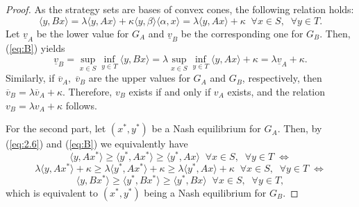 \documentclass[10pt,a4paper]{amsart}
\begin{document}
\begin{proof}
As the strategy sets are bases of convex cones, the following relation holds:
\begin{equation}\label{eq:B}
    \langle y,Bx\rangle=\lambda\langle y,Ax\rangle +\kappa\langle y,\beta\rangle\langle \alpha,x\rangle=\lambda\langle y,Ax\rangle+\kappa\;\;\forall x\in S,\;\;\forall y\in T.
\end{equation}
Let $\underline{v}_A$ be the lower value for $G_A$ and $\underline{v}_B$ be the corresponding one for $G_B$. Then, (\ref{eq:B}) yields
\begin{equation*}
    \underline{v}_B=\sup_{x\in S}\inf_{y\in T}\langle y,Bx\rangle=\lambda\sup_{x\in S}\inf_{y\in T}\langle y,Ax\rangle +\kappa =\lambda\underline{v}_A+\kappa.
\end{equation*}
Similarly, if $\overline{v}_A,\;\overline{v}_B$ are the upper values for $G_A$ and $G_B$, respectively, then $\overline{v}_B=\lambda\overline{v}_A+\kappa$. Therefore, $v_B$ exists if and only if $v_A$ exists, and the relation $v_B=\lambda v_A+\kappa$ follows.\par
For the second part, let $(x^*,y^*)$ be a Nash equilibrium for $G_A$. Then, by (\ref{eq:2.6}) and (\ref{eq:B}) we equivalently have
\begin{equation*}
    \langle y,Ax^*\rangle\geq\langle y^*,Ax^*\rangle\geq\langle y^*,Ax\rangle\;\;\forall x\in S,\;\;\forall y\in T\;\Leftrightarrow
\end{equation*}
\begin{equation*}
    \lambda\langle y,Ax^*\rangle+\kappa\geq\lambda\langle y^*,Ax^*\rangle+\kappa\geq\lambda\langle y^*,Ax\rangle+\kappa\;\;\forall x\in S,\;\;\forall y\in T\;\Leftrightarrow
\end{equation*}
\begin{equation*}
    \langle y,Bx^*\rangle\geq\langle y^*,Bx^*\rangle\geq\langle y^*,Bx\rangle\;\;\forall x\in S,\;\;\forall y\in T,
\end{equation*}
which is equivalent to $(x^*,y^*)$ being a Nash equilibrium for $G_B$.
\end{proof}
\end{document}
